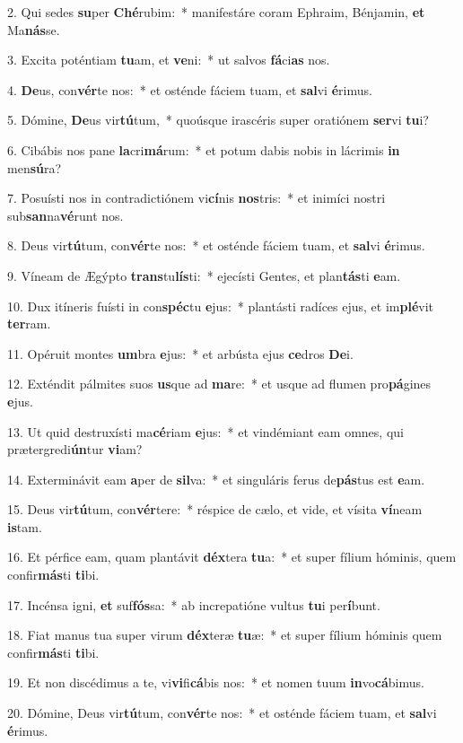 2. Qui sedes \textbf{su}per \textbf{Ché}rubim:~*  manifestáre coram Ephraim, Bénjamin, \textbf{et} Ma\textbf{nás}se.\

3. Excita poténtiam \textbf{tu}am, et \textbf{ve}ni:~*  ut salvos \textbf{fá}ci\textbf{as} nos.\

4. \textbf{De}us, con\textbf{vér}te nos:~*  et osténde fáciem tuam, et \textbf{sal}vi \textbf{é}rimus.\

5. Dómine, \textbf{De}us vir\textbf{tú}tum,~*  quoúsque irascéris super oratiónem \textbf{ser}vi \textbf{tu}i?\

6. Cibábis nos pane \textbf{la}cri\textbf{má}rum:~*  et potum dabis nobis in lácrimis \textbf{in} men\textbf{sú}ra?\

7. Posuísti nos in contradictiónem vi\textbf{cí}nis \textbf{nos}tris:~*  et inimíci nostri sub\textbf{san}na\textbf{vé}runt nos.\

8. Deus vir\textbf{tú}tum, con\textbf{vér}te nos:~*  et osténde fáciem tuam, et \textbf{sal}vi \textbf{é}rimus.\

9. Víneam de Ægýpto \textbf{trans}tu\textbf{lís}ti:~*  ejecísti Gentes, et plan\textbf{tás}ti \textbf{e}am.\

10. Dux itíneris fuísti in con\textbf{spéc}tu \textbf{e}jus:~*  plantásti radíces ejus, et im\textbf{plé}vit \textbf{ter}ram.\

11. Opéruit montes \textbf{um}bra \textbf{e}jus:~*  et arbústa ejus \textbf{ce}dros \textbf{De}i.\

12. Exténdit pálmites suos \textbf{us}que ad \textbf{ma}re:~*  et usque ad flumen pro\textbf{pá}gines \textbf{e}jus.\

13. Ut quid destruxísti ma\textbf{cé}riam \textbf{e}jus:~*  et vindémiant eam omnes, qui prætergredi\textbf{ún}tur \textbf{vi}am?\

14. Exterminávit eam \textbf{a}per de \textbf{sil}va:~*  et singuláris ferus de\textbf{pás}tus est \textbf{e}am.\

15. Deus vir\textbf{tú}tum, con\textbf{vér}tere:~*  réspice de cælo, et vide, et vísita \textbf{ví}neam \textbf{is}tam.\

16. Et pérfice eam, quam plantávit \textbf{déx}tera \textbf{tu}a:~*  et super fílium hóminis, quem confir\textbf{más}ti \textbf{ti}bi.\

17. Incénsa igni, \textbf{et} suf\textbf{fós}sa:~*  ab increpatióne vultus \textbf{tu}i per\textbf{í}bunt.\

18. Fiat manus tua super virum \textbf{déx}teræ \textbf{tu}æ:~*  et super fílium hóminis quem confir\textbf{más}ti \textbf{ti}bi.\

19. Et non discédimus a te, vi\textbf{vi}fi\textbf{cá}bis nos:~*  et nomen tuum \textbf{in}vo\textbf{cá}bimus.\

20. Dómine, Deus vir\textbf{tú}tum, con\textbf{vér}te nos:~*  et osténde fáciem tuam, et \textbf{sal}vi \textbf{é}rimus.\

